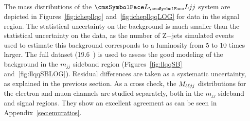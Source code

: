 The mass distributions of the $\LL jj$ system are depicted in Figures~\ref{fig:ichepllqq} and~\ref{fig:ichepllqqLOG} for data in the signal region. The statistical uncertainty on the background is much smaller than the statistical uncertainty on the data, as the number of Z+jets simulated events used to estimate this background corresponds to a luminosity from 5 to 10 times larger. The full dataset (19.6~\fbinv{}) is used to assess the good modeling of the background in the $m_{jj}$ sideband region (Figures~\ref{fig:llqqSB} and~\ref{fig:llqqSBLOG}). Residual differences are taken as a systematic uncertainty, as explained in the previous section. As a cross check, the $M_{\ell\ell jj}$ distributions for the electron and muon channels are studied separately, both in the $m_{jj}$ sideband and signal regions.  They show an excellent agreement as can be seen in Appendix~\ref{sec:emuratios}.

